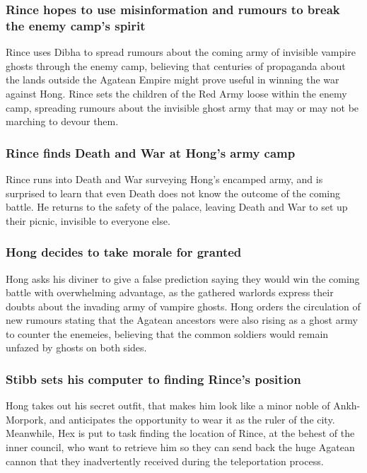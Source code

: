 \subsubsection{\Gls{Rince} hopes to use misinformation and rumours to break the enemy camp's spirit}
\Gls{Rince} uses \Gls{Dibha} to spread rumours about the coming army of invisible vampire ghosts
through the enemy camp, believing that centuries of propaganda about the lands outside the Agatean
Empire might prove useful in winning the war against \Gls{Hong}. \Gls{Rince} sets the children of
the Red Army loose within the enemy camp, spreading rumours about the invisible ghost army that
may or may not be marching to devour them.

\subsubsection{\Gls{Rince} finds \Gls{Death} and \Gls{War} at \Gls{Hong}'s army camp}
\Gls{Rince} runs into \Gls{Death} and \Gls{War} surveying \Gls{Hong}'s encamped army, and is
surprised to learn that even \Gls{Death} does not know the outcome of the coming battle. He returns
to the safety of the palace, leaving \Gls{Death} and \Gls{War} to set up their picnic, invisible to
everyone else.

\subsubsection{\Gls{Hong} decides to take morale for granted}
\Gls{Hong} asks his diviner to give a false prediction saying they would win the coming battle with
overwhelming advantage, as the gathered warlords express their doubts about the invading army of
vampire ghosts. \Gls{Hong} orders the circulation of new rumours stating that the Agatean ancestors
were also rising as a ghost army to counter the enemeies, believing that the common soldiers would
remain unfazed by ghosts on both sides.

\subsubsection{\Gls{Stibb} sets his computer to finding \Gls{Rince}'s position}
\Gls{Hong} takes out his secret outfit, that makes him look like a minor noble of Ankh-Morpork, and
anticipates the opportunity to wear it as the ruler of the city. Meanwhile, \Gls{Hex} is put to task
finding the location of \Gls{Rince}, at the behest of the inner council, who want to retrieve him
so they can send back the huge Agatean cannon that they inadvertently received during the
teleportation process.

